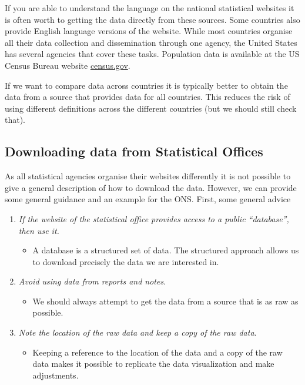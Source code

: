 \documentclass[
]{book}
\providecommand{\tightlist}{%
  \setlength{\itemsep}{0pt}\setlength{\parskip}{0pt}}
\begin{document}
If you are able to understand the language on the national statistical websites it is often worth to getting the data directly from these sources. Some countries also provide English language versions of the website. While most countries organise all their data collection and dissemination through one agency, the United States has several agencies that cover these tasks. Population data is available at the US Census Bureau website \href{https://www.census.gov/}{census.gov}.

If we want to compare data across countries it is typically better to obtain the data from a source that provides data for all countries. This reduces the risk of using different definitions across the different countries (but we should still check that).

\hypertarget{downloading-data-from-statistical-offices}{%
\subsection*{Downloading data from Statistical Offices}\label{downloading-data-from-statistical-offices}}

As all statistical agencies organise their websites differently it is not possible to give a general description of how to download the data. However, we can provide some general guidance and an example for the ONS. First, some general advice

\begin{enumerate}
\def\labelenumi{\arabic{enumi}.}
\tightlist
\item
  \emph{If the website of the statistical office provides access to a public ``database'', then use it.}

  \begin{itemize}
  \tightlist
  \item
    A database is a structured set of data. The structured approach allows us to download precisely the data we are interested in.
  \end{itemize}
\item
  \emph{Avoid using data from reports and notes}.

  \begin{itemize}
  \tightlist
  \item
    We should always attempt to get the data from a source that is as raw as possible.
  \end{itemize}
\item
  \emph{Note the location of the raw data and keep a copy of the raw data}.

  \begin{itemize}
  \tightlist
  \item
    Keeping a reference to the location of the data and a copy of the raw data makes it possible to replicate the data visualization and make adjustments.
  \end{itemize}
\end{enumerate}
\end{document}
